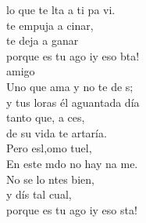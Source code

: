 \begin{cancion}[Es tu amigo es][Kairoi]
	lo que te lta a ti pa vi. \\
	te empuja a cinar, \\
	te deja a ganar\\
	porque es tu ago iy eso bta!\\
	\jump
	  amigo  \\
	Uno que  ama y no te de s;\\
	y tus loras él aguantada día \\
	tanto que, a ces,\\
	de su vida te artaría. \\
	Pero esl,omo tuel, \\
	En este mdo no hay na me.\\
	No se lo ntes bien,\\
	y dís tal cual,\\
	porque es tu ago iy eso sta!\\
\end{cancion}%
